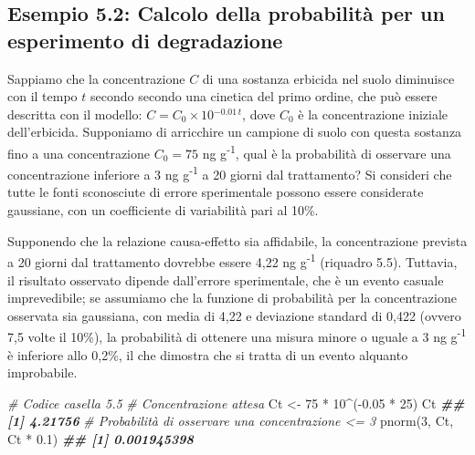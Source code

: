 \documentclass[
  12pt,
]{book}
\newenvironment{Shaded}{\begin{snugshade}}{\end{snugshade}}
\newcommand{\CommentTok}[1]{\textcolor[rgb]{0.56,0.35,0.01}{\textit{#1}}}
\newcommand{\DecValTok}[1]{\textcolor[rgb]{0.00,0.00,0.81}{#1}}
\newcommand{\DocumentationTok}[1]{\textcolor[rgb]{0.56,0.35,0.01}{\textbf{\textit{#1}}}}
\newcommand{\FloatTok}[1]{\textcolor[rgb]{0.00,0.00,0.81}{#1}}
\newcommand{\FunctionTok}[1]{\textcolor[rgb]{0.00,0.00,0.00}{#1}}
\newcommand{\NormalTok}[1]{#1}
\newcommand{\OtherTok}[1]{\textcolor[rgb]{0.56,0.35,0.01}{#1}}
\newcommand{\SpecialCharTok}[1]{\textcolor[rgb]{0.00,0.00,0.00}{#1}}
\begin{document}
\hypertarget{esempio-5.2-calcolo-della-probabilituxe0-per-un-esperimento-di-degradazione}{%
\subsection{Esempio 5.2: Calcolo della probabilità per un esperimento di degradazione}\label{esempio-5.2-calcolo-della-probabilituxe0-per-un-esperimento-di-degradazione}}

Sappiamo che la concentrazione \(C\) di una sostanza erbicida nel suolo diminuisce con il tempo \(t\) secondo secondo una cinetica del primo ordine, che può essere descritta con il modello: \(C = C_0 \times 10{^{-0.01 \, t}}\), dove \(C_0\) è la concentrazione iniziale dell'erbicida. Supponiamo di arricchire un campione di suolo con questa sostanza fino a una concentrazione \(C_0 = 75\) ng g\textsuperscript{-1}, qual è la probabilità di osservare una concentrazione inferiore a 3 ng g\textsuperscript{-1} a 20 giorni dal trattamento? Si consideri che tutte le fonti sconosciute di errore sperimentale possono essere considerate gaussiane, con un coefficiente di variabilità pari al 10\%.

Supponendo che la relazione causa-effetto sia affidabile, la concentrazione prevista a 20 giorni dal trattamento dovrebbe essere 4,22 ng g\textsuperscript{-1} (riquadro 5.5). Tuttavia, il risultato osservato dipende dall'errore sperimentale, che è un evento casuale imprevedibile; se assumiamo che la funzione di probabilità per la concentrazione osservata sia gaussiana, con media di 4,22 e deviazione standard di 0,422 (ovvero 7,5 volte il 10\%), la probabilità di ottenere una misura minore o uguale a 3 ng g\textsuperscript{-1} è inferiore allo 0,2\%, il che dimostra che si tratta di un evento alquanto improbabile.

\begin{Shaded}
\begin{Highlighting}[]
\CommentTok{\# Codice casella 5.5}
\CommentTok{\# Concentrazione attesa}
\NormalTok{Ct }\OtherTok{\textless{}{-}} \DecValTok{75} \SpecialCharTok{*} \DecValTok{10}\SpecialCharTok{\^{}}\NormalTok{(}\SpecialCharTok{{-}}\FloatTok{0.05} \SpecialCharTok{*} \DecValTok{25}\NormalTok{)}
\NormalTok{Ct}
\DocumentationTok{\#\# [1] 4.21756}
\CommentTok{\# Probabilità di osservare una concentrazione \textless{}= 3}
\FunctionTok{pnorm}\NormalTok{(}\DecValTok{3}\NormalTok{, Ct, Ct }\SpecialCharTok{*} \FloatTok{0.1}\NormalTok{)}
\DocumentationTok{\#\# [1] 0.001945398}
\end{Highlighting}
\end{Shaded}
\end{document}
